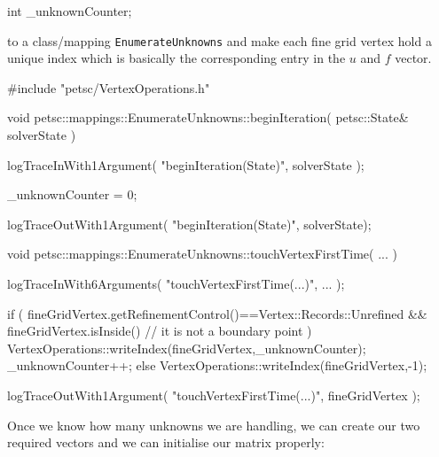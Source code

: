 \begin{code}
int  _unknownCounter;
\end{code}

\noindent
to a class/mapping \texttt{EnumerateUnknowns} and make each fine grid vertex
hold a unique index which is basically the corresponding entry in the $u$ and $f$ vector.

\begin{code}
#include "petsc/VertexOperations.h"

void petsc::mappings::EnumerateUnknowns::beginIteration(
  petsc::State&  solverState
) {
  logTraceInWith1Argument( "beginIteration(State)", solverState );

  _unknownCounter = 0;

  logTraceOutWith1Argument( "beginIteration(State)", solverState);
}

void petsc::mappings::EnumerateUnknowns::touchVertexFirstTime(
  ...
) {
  logTraceInWith6Arguments( "touchVertexFirstTime(...)", ... );

  if (
    fineGridVertex.getRefinementControl()==Vertex::Records::Unrefined
    &&
    fineGridVertex.isInside() // it is not a boundary point
  ) {
    VertexOperations::writeIndex(fineGridVertex,_unknownCounter);
    _unknownCounter++;
  }
  else {
    VertexOperations::writeIndex(fineGridVertex,-1);
  }

  logTraceOutWith1Argument( "touchVertexFirstTime(...)", fineGridVertex );
}
\end{code}

\noindent
Once we know how many unknowns we are handling, we can create our two required
vectors and we can initialise our matrix properly:


